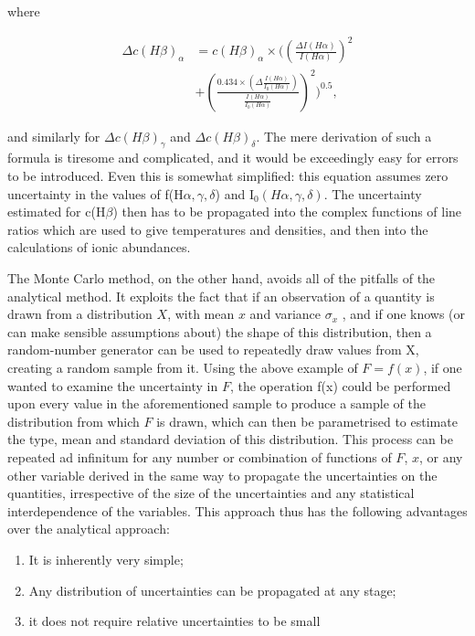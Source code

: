 \documentclass[useAMS,usenatbib]{mn2e}
\begin{document}
where

\begin{eqnarray}
\Delta c(H\beta)_\alpha &= c(H\beta)_\alpha \times \bigg(\left(\frac{\Delta I(H\alpha)}{I(H\alpha)}\right)^2 \\
&+ \left(\frac{0.434 \times (\Delta\frac{I(H\alpha)}{I_0(H\alpha)})}{\frac{I(H\alpha)}{I_0(H\alpha)}}\right)^2\bigg)^{0.5},
\end{eqnarray}

and similarly for $\Delta c(H\beta)_\gamma$ and $\Delta c(H\beta)_\delta$.  The mere derivation of such a formula is tiresome and complicated, and it would be exceedingly easy for errors to be introduced.  Even this is somewhat simplified: this equation assumes zero uncertainty in the values of f(H$\alpha, \gamma, \delta$) and I$_0(H\alpha, \gamma, \delta)$.  The uncertainty estimated for c(H$\beta$) then has to be propagated into the complex functions of line ratios which are used to give temperatures and densities, and then into the calculations of ionic abundances.

The Monte Carlo method, on the other hand, avoids all of the pitfalls of the analytical method.  It exploits the fact that if an observation of a quantity is drawn from a distribution $X$, with mean $x$ and variance $\sigma_x$ , and if one knows (or can make sensible assumptions about) the shape of this distribution, then a random-number generator can be used to repeatedly draw values from X, creating a random sample from it. Using the above example of $F = f (x)$, if one wanted to examine the uncertainty in $F$, the operation f(x) could be performed upon every value in the aforementioned sample to produce a sample of the distribution from which $F$ is drawn, which can then be parametrised to estimate the type, mean and standard deviation of this distribution. This process can be repeated ad infinitum for any number or combination of functions of $F$, $x$, or any other variable derived in the same way to propagate the uncertainties on the quantities, irrespective of the size of the uncertainties and any statistical interdependence of the variables.  This approach thus has the following advantages over the analytical approach:

\begin{enumerate}
  \item It is inherently very simple;
  \item Any distribution of uncertainties can be propagated at any stage;
  \item it does not require relative uncertainties to be small
\end{enumerate}
\end{document}
